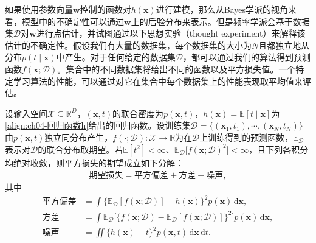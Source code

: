 \documentclass[../../main.tex]{subfiles}
\begin{document}
如果使用参数向量$\boldsymbol{w}$控制的函数对$h(\boldsymbol{x})$进行建模，那么从Bayes学派的视角来看，模型中的不确定性可以通过$\boldsymbol{w}$上的后验分布来表示。但是频率学派会基于数据集$\mathcal{D}$对$\boldsymbol{w}$进行点估计，并试图通过以下思想实验（thought experiment）来解释该估计的不确定性。假设我们有大量的数据集，每个数据集的大小为$N$且都独立地从分布$p(t\mid\boldsymbol{x})$中产生。对于任何给定的数据集$\mathcal{D}$，都可以通过我们的算法得到预测函数$f(\boldsymbol{x};\mathcal{D})$。集合中的不同数据集将给出不同的函数以及平方损失值。一个特定学习算法的性能，可以通过对它在集合中每个数据集上的性能表现取平均值来评估。

\begin{theorem}[偏差-方差分解]\label{theorem:ch04-偏差方差分解}
设输入空间$\mathcal{X}\subseteq\mathbb{R}^{D}$，$(\boldsymbol{x},t)$的联合密度为$p(\boldsymbol{x},t)$，$h(\boldsymbol{x})=\mathbb{E}[t\mid\boldsymbol{x}]$为\eqref{align:ch04-回归函数h}给出的回归函数。设训练集$\mathcal{D}=\{(\boldsymbol{x}_1,t_1),\cdots,(\boldsymbol{x}_N,t_N)\}$由$p(\boldsymbol{x},t)$独立同分布产生，$f(\cdot;\mathcal{D}):\mathcal{X}\to\mathbb{R}$为在$\mathcal{D}$上训练得到的预测函数，$\mathbb{E}_{\mathcal{D}}$表示对$\mathcal{D}$的联合分布取期望。若$\mathbb{E}[t^{2}]<\infty$、$\mathbb{E}_{\mathcal{D}}\bigl[f(\boldsymbol{x};\mathcal{D})^{2}\bigr]<\infty$，且下列各积分均绝对收敛，则平方损失的期望成立如下分解：
\begin{align}
  \text{期望损失}=\text{平方偏差}+\text{方差}+\text{噪声},
  \label{align:ch04-偏差方差噪声}
\end{align}
其中
\begin{align}
  \text{平方偏差}&=\int\bigl\{\mathbb{E}_{\mathcal{D}}[f(\boldsymbol{x};\mathcal{D})]-h(\boldsymbol{x})\bigr\}^2p(\boldsymbol{x})\,\mathrm{d}\boldsymbol{x},
  \label{align:ch04-平方偏差}\\
  \text{方差}&=\int\mathbb{E}_{\mathcal{D}}\bigl[\{f(\boldsymbol{x};\mathcal{D})-\mathbb{E}_{\mathcal{D}}[f(\boldsymbol{x};\mathcal{D})]\}^2\bigr]p(\boldsymbol{x})\,\mathrm{d}\boldsymbol{x},
  \label{align:ch04-方差}\\
  \text{噪声}&=\iint\{h(\boldsymbol{x})-t\}^2p(\boldsymbol{x},t)\,\mathrm{d}\boldsymbol{x}\,\mathrm{d}t.
  \label{align:ch04-不可约噪声}
\end{align}
\end{theorem}
\end{document}
